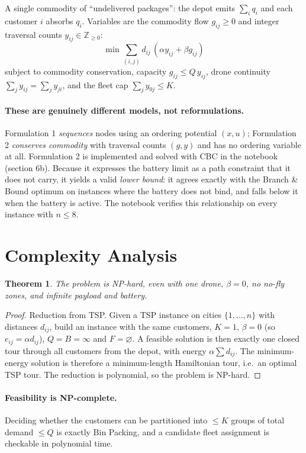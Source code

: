 \documentclass[11pt,a4paper]{article}
\newtheorem{theorem}{Theorem}
\begin{document}
A single commodity of ``undelivered packages'': the depot emits $\sum_i q_i$ and
each customer $i$ absorbs $q_i$. Variables are the commodity flow $g_{ij}\ge 0$
and integer traversal counts $y_{ij}\in\mathbb{Z}_{\ge0}$:
\[
  \min \sum_{(i,j)} d_{ij}\,(\alpha y_{ij} + \beta g_{ij})
\]
subject to commodity conservation, capacity $g_{ij}\le Q\,y_{ij}$, drone
continuity $\sum_j y_{ij}=\sum_j y_{ji}$, and the fleet cap
$\sum_j y_{0j}\le K$.

\paragraph{These are genuinely different models, not reformulations.}
Formulation 1 \emph{sequences} nodes using an ordering potential $(x,u)$;
Formulation 2 \emph{conserves commodity} with traversal counts $(g,y)$ and has no
ordering variable at all. Formulation 2 is implemented and solved with CBC in the
notebook (section 6b). Because it expresses the battery limit as a path
constraint that it does not carry, it yields a valid \emph{lower bound}: it agrees
exactly with the Branch \& Bound optimum on instances where the battery does not
bind, and falls below it when the battery is active. The notebook verifies this
relationship on every instance with $n \le 8$.

\section{Complexity Analysis}

\begin{theorem}
The problem is NP-hard, even with one drone, $\beta=0$, no no-fly zones, and
infinite payload and battery.
\end{theorem}

\begin{proof}
Reduction from TSP. Given a TSP instance on cities $\{1,\dots,n\}$ with distances
$d_{ij}$, build an instance with the same customers, $K=1$, $\beta=0$ (so
$e_{ij}=\alpha d_{ij}$), $Q=B=\infty$ and $F=\varnothing$. A feasible solution is
then exactly one closed tour through all customers from the depot, with energy
$\alpha\sum d_{ij}$. The minimum-energy solution is therefore a minimum-length
Hamiltonian tour, i.e.\ an optimal TSP tour. The reduction is polynomial, so the
problem is NP-hard.
\end{proof}

\paragraph{Feasibility is NP-complete.}
Deciding whether the customers can be partitioned into $\le K$ groups of total
demand $\le Q$ is exactly Bin Packing, and a candidate fleet assignment is
checkable in polynomial time.
\end{document}
